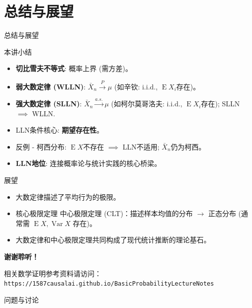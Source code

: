 \documentclass[UTF8]{beamer}
\DeclareMathOperator{\E}{\operatorname{E}}
\DeclareMathOperator{\Var}{\operatorname{Var}}
\begin{document}
\section{总结与展望}
\begin{frame}{总结与展望}
    \begin{block}{本讲小结}
        \begin{itemize}
            \item \textbf{切比雪夫不等式}: 概率上界 (需方差)。
            \item \textbf{弱大数定律 (WLLN)}: $\bar{X}_n \xrightarrow{P} \mu$ (如辛钦: i.i.d., $\E X_i$存在)。
            \item \textbf{强大数定律 (SLLN)}: $\bar{X}_n \xrightarrow{a.s.} \mu$ (如柯尔莫哥洛夫: i.i.d., $\E X_i$存在); SLLN $\implies$ WLLN.
            \item \alert{LLN条件核心}: \textbf{期望存在性}。
            \item \alert{反例 - 柯西分布}: $\E X$不存在 $\implies$ LLN不适用; $\bar{X}_n$仍为柯西。
            \item \textbf{LLN地位}: 连接概率论与统计实践的\alert{核心桥梁}。
        \end{itemize}
    \end{block}
\end{frame}

\begin{frame}
    \begin{alertblock}{展望}
        \begin{itemize}
            \item 大数定律描述了\alert{平均}行为的极限。
            \item 核心极限定理 \alert{中心极限定理 (CLT)}：描述样本均值的\alert{分布} $\rightarrow$ 正态分布 (通常需 $\E X, \Var X$ 存在)。
            \item 大数定律和中心极限定理共同构成了现代统计推断的理论基石。
        \end{itemize}
    \end{alertblock}
\end{frame}

\begin{frame}
    \centering
    \Huge{\bfseries 谢谢聆听！}
    
    \vspace{0.5cm} %
    \normalsize
    相关数学证明参考资料请访问： \\
    \texttt{https://1587causalai.github.io/BasicProbabilityLectureNotes}

    \vspace{1cm}
    \normalsize
    问题与讨论
\end{frame}
\end{document}
